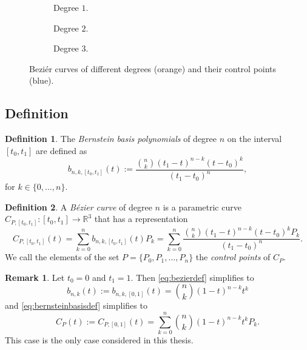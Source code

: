 \documentclass[a4paper, 11pt]{report}
\theoremstyle{definition}
\newtheorem{definition}{Definition}[section]
\newtheorem*{remark}{Remark}
\renewcommand{\emph}[1]{\textit{#1}}
\begin{document}
\begin{figure}[!ht]
	\centering
	\begin{subfigure}{0.25\textwidth}
		
		\caption{Degree $1$.}
	\end{subfigure}
	\begin{subfigure}{0.25\textwidth}
		
		\caption{Degree $2$.}
	\end{subfigure}
	\begin{subfigure}{0.25\textwidth}
		
		\caption{Degree $3$.}
	\end{subfigure}
	\caption{Beziér curves of different degrees (orange) and their control points (blue).}
\end{figure}

\subsection{Definition}
\begin{definition}
	The \emph{Bernstein basis polynomials} of degree $n$ on the interval $[t_0,t_1]$ are defined as
	\begin{equation}\label{eq:bernsteinbasisdef}
		b_{n,k,[t_0, t_1]}(t) := \frac{\binom{n}{k} (t_1-t)^{n-k}(t-t_0)^k}{(t_1-t_0)^n},
	\end{equation}
	for $k \in \{0,\dots, n\}$.
\end{definition}

\begin{definition}
	A \emph{Bézier curve} of degree $n$ is a parametric curve $C_{P,[t_0, t_1]}: [t_0, t_1] \rightarrow \mathbb{R}^3$ that has a representation
	\begin{equation}\label{eq:bezierdef}
		C_{P, [t_0, t_1]}(t) = \sum_{k=0}^n b_{n,k,[t_0, t_1]}(t) P_k = \sum_{k=0}^n \frac{\binom{n}{k} (t_1-t)^{n-k}(t-t_0)^k P_k}{(t_1-t_0)^n}.
	\end{equation}
	We call the elements of the set $P = \{P_0, P_1, \dots, P_n\}$ the \emph{control points} of $C_P$.
\end{definition}

\begin{remark}
	Let $t_0 = 0$ and $t_1 = 1$. Then \ref{eq:bezierdef} simplifies to
	\begin{equation}
		b_{n,k}(t) := b_{n,k,[0,1]}(t) = \binom{n}{k} (1-t)^{n-k}t^k
	\end{equation}
	and \ref{eq:bernsteinbasisdef} simplifies to
	\begin{equation}\label{eq:bezierdefshort}
		C_P(t) := C_{P,[0,1]}(t)= \sum_{k=0}^n \binom{n}{k} (1-t)^{n-k}t^k P_k.
	\end{equation}
	This case is the only case considered in this thesis.
\end{remark}
\end{document}
